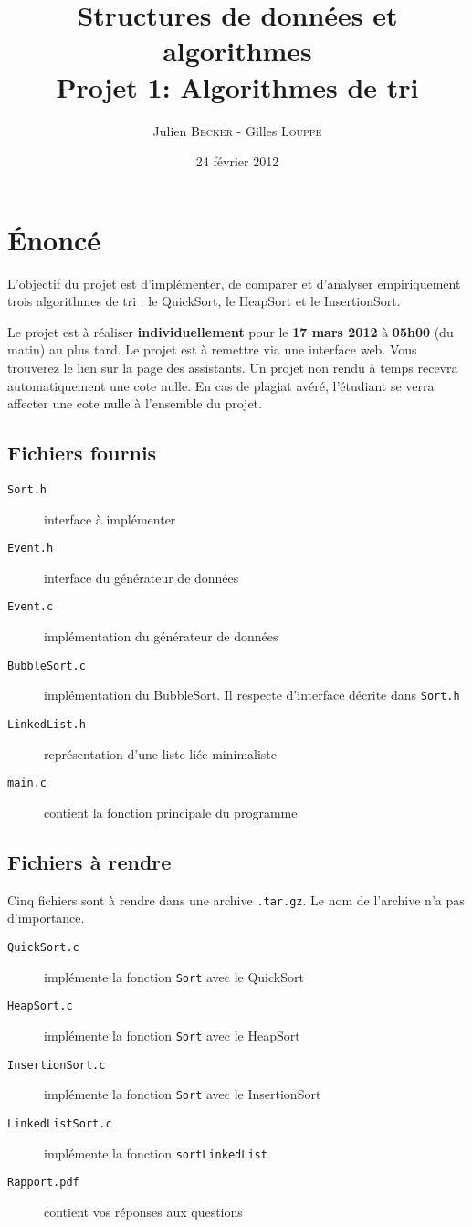 \documentclass[a4paper,10pt]{article}
\title{
    \textbf{Structures de données et algorithmes}\\
    Projet 1: Algorithmes de tri
}
\author{Julien \textsc{Becker} - Gilles \textsc{Louppe}}
\date{24 février 2012}
\begin{document}
\maketitle

\section*{\'Enoncé}

L'objectif du projet est d'implémenter, de comparer et d'analyser empiriquement
trois algorithmes de tri : le QuickSort, le HeapSort et le InsertionSort.

Le projet est à réaliser {\bf individuellement} pour le {\bf 17 mars 2012} à
{\bf 05h00} (du matin) au plus tard. Le projet est à remettre via une interface
web. Vous trouverez le lien sur la page des assistants. Un projet non rendu à
temps recevra automatiquement une cote nulle. En cas de plagiat avéré,
l'étudiant se verra affecter une cote nulle à l'ensemble du projet.

\subsection*{Fichiers fournis}
\begin{description}
\item[\texttt{Sort.h}] interface à implémenter
\item[\texttt{Event.h}] interface du générateur de données
\item[\texttt{Event.c}] implémentation du générateur de données
\item[\texttt{BubbleSort.c}] implémentation du BubbleSort. Il respecte d'interface décrite dans \texttt{Sort.h}
\item[\texttt{LinkedList.h}] représentation d'une liste liée minimaliste
\item[\texttt{main.c}] contient la fonction principale du programme
\end{description}
\subsection*{Fichiers à rendre}
Cinq fichiers sont à rendre dans une archive \texttt{.tar.gz}. Le nom de l'archive n'a pas d'importance.
\begin{description}
\item[\texttt{QuickSort.c}] implémente la fonction \texttt{Sort} avec le QuickSort
\item[\texttt{HeapSort.c}] implémente la fonction \texttt{Sort} avec le HeapSort
\item[\texttt{InsertionSort.c}] implémente la fonction \texttt{Sort} avec le InsertionSort
\item[\texttt{LinkedListSort.c}] implémente la fonction \texttt{sortLinkedList}
\item[\texttt{Rapport.pdf}] contient vos réponses aux questions
\end{description}
\end{document}
